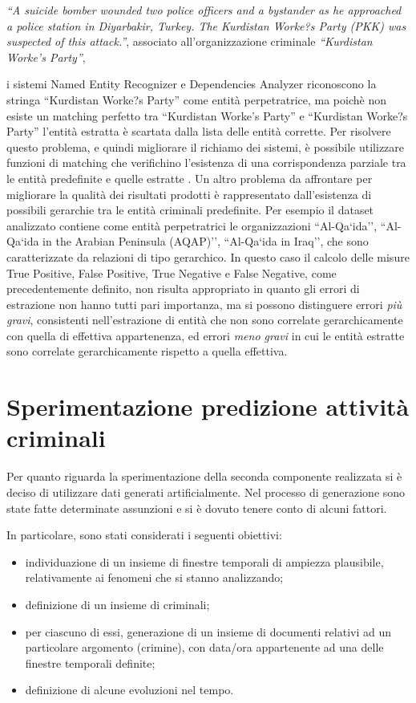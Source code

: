 \textit{``A suicide bomber wounded two police officers and a bystander as he approached a police station in Diyarbakir, Turkey. The Kurdistan Worke?s Party (PKK) was suspected of this attack.''}, associato all'organizzazione criminale \textit{``Kurdistan Worke's Party''},

i sistemi Named Entity Recognizer e Dependencies Analyzer riconoscono la stringa ``Kurdistan Worke?s Party'' come entità perpetratrice, ma poichè non esiste un matching perfetto tra ``Kurdistan Worke's Party'' e ``Kurdistan Worke?s Party'' l'entità estratta è scartata dalla lista delle entità corrette.
Per risolvere questo problema, e quindi migliorare il richiamo dei sistemi, è possibile utilizzare funzioni di matching che verifichino l'esistenza di una corrispondenza parziale tra le entità predefinite e quelle estratte \cite{Deng12}.
Un altro problema da affrontare per migliorare la qualità dei risultati prodotti è rappresentato dall'esistenza di possibili gerarchie tra le entità criminali predefinite. 
Per esempio il dataset analizzato contiene come entità perpetratrici le organizzazioni ``Al-Qa`ida'', ``Al-Qa`ida in the Arabian Peninsula (AQAP)'', ``Al-Qa`ida in Iraq'', che sono caratterizzate da relazioni di tipo gerarchico. In questo caso il calcolo delle misure True Positive, False Positive, True Negative e False Negative, come precedentemente definito, non risulta appropriato in quanto gli errori di estrazione non hanno tutti pari importanza, ma  si possono distinguere errori \textit{più gravi}, consistenti  nell'estrazione di entità che non sono correlate gerarchicamente con quella di effettiva appartenenza, ed errori \textit{meno gravi} in cui le entità estratte sono correlate gerarchicamente rispetto a quella effettiva.

\section{Sperimentazione predizione attività criminali}
Per quanto riguarda la sperimentazione della seconda componente realizzata si è deciso di utilizzare dati generati artificialmente. Nel processo di generazione sono state fatte determinate assunzioni e si è dovuto tenere conto di alcuni fattori. 

In particolare, sono stati considerati i seguenti obiettivi:
\begin{itemize}
	\item individuazione di un insieme di finestre temporali di ampiezza plausibile, relativamente ai fenomeni che si stanno analizzando;
	\item definizione di un insieme di criminali;
	\item per ciascuno di essi, generazione di un insieme di documenti relativi ad un particolare argomento (crimine), con data/ora appartenente ad una delle finestre temporali definite;
	\item definizione di alcune evoluzioni nel tempo.
\end{itemize}

